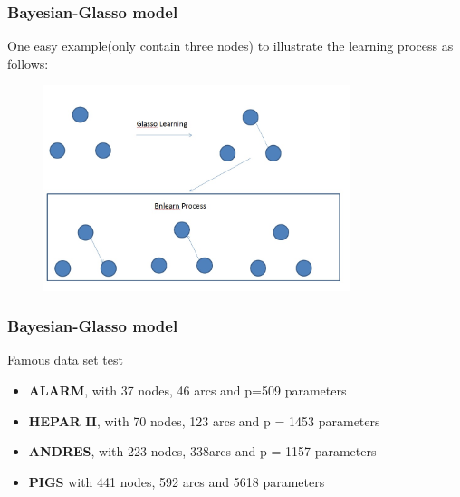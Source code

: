 \documentclass{beamer}
\begin{document}
\begin{frame}
\frametitle{Bayesian-Glasso model}
One easy example(only contain three nodes) to illustrate the learning process as follows:\\
 \begin{center}
 \begin{figure}
     \includegraphics[width=0.8\textwidth, height=0.7\textheight]{bnglasso.jpg}

    \end{figure}
\end{center}

\end{frame}


\begin{frame}
\frametitle{Bayesian-Glasso model}
  \begin{block}{Famous data set test}
    \begin{itemize}
        \item  \textbf{ALARM}, with 37 nodes, 46 arcs and p=509 parameters
        \item  \textbf{HEPAR II}, with 70 nodes, 123 arcs and p = 1453 parameters
        \item  \textbf{ANDRES}, with 223 nodes, 338arcs and p = 1157 parameters
        \item  \textbf{PIGS} with 441 nodes, 592 arcs and 5618 parameters

    \end{itemize}
  \end{block}


\end{frame}
\end{document}
